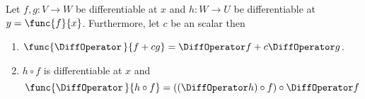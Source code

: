 \begin{proposition}
    Let \(f,g : V \to W\) be differentiable at \(x\) and \(h : W \to U\) be differentiable at \(y = \func{f}{x}\). Furthermore, let \(c\) be an scalar then
    \begin{enumerate}
        \item \(\func{\DiffOperator \,}{ f + cg} = \DiffOperator f + c \DiffOperator g\).
        \item  \(h \circ f\) is differentiable at \(x\) and
              \begin{equation*}
                  \func{\DiffOperator \,}{ h \circ f} =  \left( (\DiffOperator h) \circ f \right) \circ \DiffOperator f
              \end{equation*}
    \end{enumerate}
\end{proposition}

